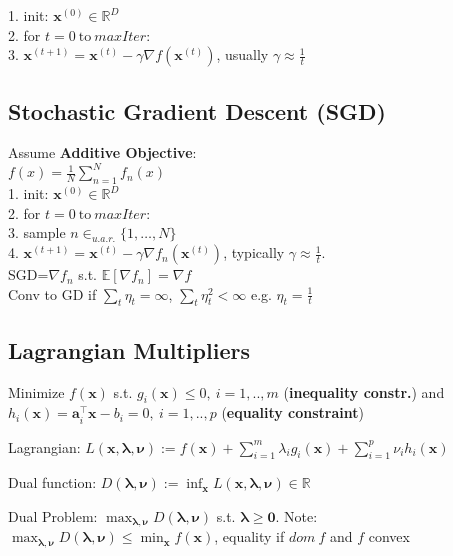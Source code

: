 1. init: $\mathbf{x}^{(0)} \in \mathbb{R}^D$\\
2. for $t = 0 \ \text{to} \ \mathit{maxIter}$:\\
3. $\mathbf{x}^{(t+1)} = \mathbf{x}^{(t)} - \gamma \nabla f(\mathbf{x}^{(t)})$, usually $\gamma \approx \frac{1}{t}$

\subsection*{Stochastic Gradient Descent (SGD)}
Assume \textbf{Additive Objective}:\\
$f(x) = \frac{1}{N}\sum_{n=1}^{N}f_n(x)$\\
1. init: $\mathbf{x}^{(0)} \in \mathbb{R}^D$\\
2. for $t = 0 \ \text{to} \ \mathit{maxIter}$:\\
3. sample $n \in_{u.a.r.} \{1, \ldots, N\}$\\
4. $\mathbf{x}^{(t+1)} = \mathbf{x}^{(t)} - \gamma \nabla f_n(\mathbf{x}^{(t)})$, typically  $\gamma \approx \frac{1}{t}$.\\
SGD=$\nabla f_n$ s.t. $\mathbb{E}[\nabla f_n] = \nabla f$\\
Conv to GD if $\sum_{t} \eta_t = \infty$, $\sum_{t}\eta_t^2<\infty$ e.g. $\eta_t = \frac{1}{t}$


\subsection*{Lagrangian Multipliers}
Minimize  $f(\mathbf{x})$ s.t. $g_i(\mathbf{x}) \leq 0,\ i = 1, .., m$ (\textbf{inequality constr.}) and $h_i(\mathbf{x}) = \mathbf{a}_i^\top \mathbf{x} - b_i = 0,\ i = 1, .., p$ (\textbf{equality constraint})
\begin{compactdesc}
	\item[Lagrangian:] $L(\mathbf{x}, \boldsymbol{\lambda}, \boldsymbol{\nu}) := f(\mathbf{x}) + \sum_{i=1}^m \lambda_i g_i(\mathbf{x}) + \sum_{i=1}^p \nu_i h_i(\mathbf{x})$
	\item[Dual function:] $D(\boldsymbol{\lambda}, \boldsymbol{\nu}) := \inf_{\mathbf{x}} L(\mathbf{x}, \boldsymbol{\lambda}, \boldsymbol{\nu}) \in \mathbb{R}$
	\item[Dual Problem:] $\max_{\boldsymbol{\lambda}, \boldsymbol{\nu}} D(\boldsymbol{\lambda}, \boldsymbol{\nu})$ s.t. $\boldsymbol{\lambda} \geq \mathbf{0}$. Note: $\max_{\boldsymbol{\lambda}, \boldsymbol{\nu}} D(\boldsymbol{\lambda}, \boldsymbol{\nu}) \le \min_\mathbf{x}{f(\mathbf{x})}$, equality if $dom\ f$ and $f$ convex
\end{compactdesc}

